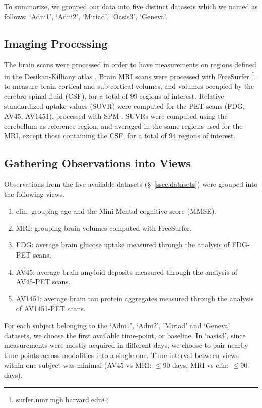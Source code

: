 To summarize, we grouped our data into five distinct datasets which we named as follows: `Adni1', `Adni2', `Miriad', `Oasis3', `Geneva'.

\subsection{Imaging Processing}
The brain scans were processed in order to have measurements on regions defined in the Desikan-Killiany atlas \citep{Desikan2006}.
Brain MRI scans were processed with FreeSurfer \footnote{\href{https://surfer.nmr.mgh.harvard.edu/}{surfer.nmr.mgh.harvard.edu}} \citep{freesurfer} to measure brain cortical and sub-cortical volumes, and volumes occupied by the cerebro-spinal fluid (CSF), for a total of $99$ regions of interest.
Relative standardized uptake values (SUVR) were computed for the PET scans (FDG, AV45, AV1451), processed with SPM \citep{Ashburner2000}.
SUVRs were computed using the cerebellum as reference region, and averaged in the same regions used for the MRI, except those containing the CSF, for a total of $94$ regions of interest.

\subsection{Gathering Observations into Views}
\label{ssec:views}


Observations from the five available datasets (\S~\ref{ssec:datasets}) were grouped into the following views.
\begin{enumerate}
\item clin: grouping age and the Mini-Mental cognitive score (MMSE).
\item MRI: grouping brain volumes computed with FreeSurfer.
\item FDG: average brain glucose uptake measured through the analysis of FDG-PET scans.
\item AV45: average brain amyloid deposits measured through the analysis of AV45-PET scans.
\item AV1451: average brain tau protein aggregates measured through the analysis of AV1451-PET scans.
\end{enumerate}

For each subject belonging to the `Adni1', `Adni2', 'Miriad' and `Geneva' datasets, we choose the first available time-point, or baseline.
In `oasis3', since measurements were mostly acquired in different days, we choose to pair nearby time points across modalities into a single one.
Time interval between views within one subject was minimal (AV45 vs MRI: $\leq 90$ days, MRI vs clin: $\leq 90$ days).

